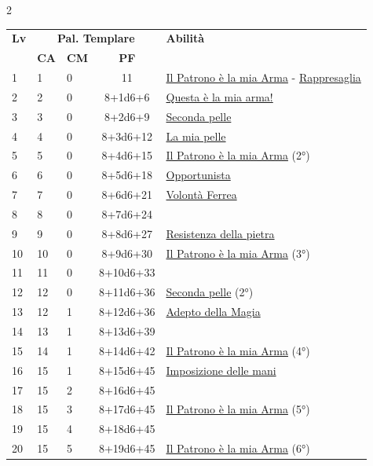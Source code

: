 {\begin{multicols}{2}


\noindent\begin{tabularx}{\linewidth}{p{0.55cm}|p{0.55cm}p{0.55cm}c|X|}
	\toprule
 \rowcolor{gray!20}	\textbf{Lv} & \multicolumn{3}{c|}{\textbf{Pal. Templare}} & \textbf{Abilità} \\
& \centering\arraybackslash \textbf{CA} & \centering\arraybackslash \textbf{CM} & \centering\arraybackslash \textbf{PF} & \\
	\toprule
	1 & 1 & 0 & 11 & \hyperlink{Il Patrono è la mia Arma}{Il Patrono è la mia Arma} - \hyperlink{Rappresaglia}{Rappresaglia}\\
	\rowcolor{gray!20}2 & 2 & 0 & 8+1d6+6 & \hyperlink{Questa è la mia arma!}{Questa è la mia arma!}\\
	3 & 3 & 0 & 8+2d6+9 & \hyperlink{Seconda pelle}{Seconda pelle}\\
	\rowcolor{gray!20}4 & 4 & 0 & 8+3d6+12 & \hyperlink{La mia pelle}{La mia pelle}\\
	5 & 5 & 0 & 8+4d6+15 & \hyperlink{Il Patrono è la mia Arma}{Il Patrono è la mia Arma} (2°)\\
	\rowcolor{gray!20}6 & 6 & 0 & 8+5d6+18 & \hyperlink{Opportunista}{Opportunista}\\
	7 & 7 & 0 & 8+6d6+21 & \hyperlink{Volonta' Ferrea}{Volontà Ferrea}\\
	\rowcolor{gray!20}8 & 8 & 0 & 8+7d6+24 & \\
	9 & 9 & 0 & 8+8d6+27 & \hyperlink{Resistenza della pietra}{Resistenza della pietra}\\
	\rowcolor{gray!20}10 & 10 & 0 & 8+9d6+30 & \hyperlink{Il Patrono è la mia Arma}{Il Patrono è la mia Arma} (3°)\\
	11 & 11 & 0 & 8+10d6+33 & \\
	\rowcolor{gray!20}12 & 12 & 0 & 8+11d6+36 & \hyperlink{Seconda pelle}{Seconda pelle} (2°)\\
	13 & 12 & 1 & 8+12d6+36 & \hyperlink{Adepto della Magia}{Adepto della Magia}\\
	\rowcolor{gray!20}14 & 13 & 1 & 8+13d6+39 & \\
	15 & 14 & 1 & 8+14d6+42 & \hyperlink{Il Patrono è la mia Arma}{Il Patrono è la mia Arma} (4°)\\
	\rowcolor{gray!20}16 & 15 & 1 & 8+15d6+45 & \hyperlink{Imposizione delle mani}{Imposizione delle mani}\\
	17 & 15 & 2 & 8+16d6+45 & \\
	\rowcolor{gray!20}18 & 15 & 3 & 8+17d6+45 & \hyperlink{Il Patrono è la mia Arma}{Il Patrono è la mia Arma} (5°)\\
	19 & 15 & 4 & 8+18d6+45 & \\
	\rowcolor{gray!20}20 & 15 & 5 & 8+19d6+45 & \hyperlink{Il Patrono è la mia Arma}{Il Patrono è la mia Arma} (6°)\\
\end{tabularx}



\end{multicols}}

